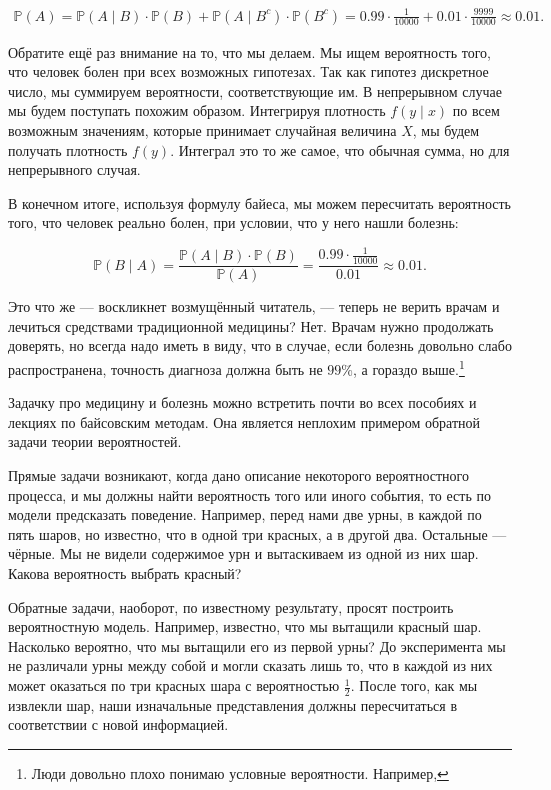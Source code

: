 \documentclass[12pt, a4paper, oneside]{extreport}
\def \mbb{\mathbb}
\def \PP{\mbb{P}}
\theoremstyle{plain}              %
\theoremstyle{definition}         %
\begin{document}
\begin{multline*}
\PP(A)  = \PP(A\mid B) \cdot \PP(B) + \PP(A \mid B^{c})  \cdot \PP(B^{c})  = 0.99 \cdot \frac{1}{10000} + 0.01 \cdot \frac{9999}{10000} \approx 0.01.
\end{multline*}

Обратите ещё раз внимание на то, что мы делаем. Мы ищем вероятность того, что человек болен при всех возможных гипотезах. Так как гипотез дискретное число, мы суммируем вероятности, соответствующие им.  В непрерывном случае мы будем поступать похожим образом.  Интегрируя плотность $f(y \mid x)$ по всем возможным значениям, которые принимает случайная величина $X$, мы будем получать плотность $f(y)$. Интеграл это то же самое, что обычная сумма, но для непрерывного случая.

В конечном итоге, используя формулу байеса, мы можем пересчитать вероятность того, что человек реально болен, при условии, что у него нашли болезнь:

\[  \PP(B \mid A) = \frac{ \PP(A \mid B)\cdot \PP(B) }{\PP(A)}  = \frac{0.99 \cdot \frac{1}{10000}}{0.01} \approx 0.01. \]

Это что же --- воскликнет возмущённый читатель, --- теперь не верить врачам и лечиться средствами традиционной медицины? Нет. Врачам нужно продолжать доверять, но всегда надо иметь в виду, что в случае, если болезнь довольно слабо распространена, точность диагноза должна быть не $99\%$, а гораздо выше.\footnote{Люди довольно плохо понимаю условные вероятности. Например, }

Задачку про медицину и болезнь можно встретить почти во всех пособиях и лекциях по байсовским методам. Она является неплохим примером обратной задачи теории вероятностей. 

Прямые задачи возникают, когда дано описание некоторого вероятностного процесса, и мы должны найти вероятность того или иного события, то есть по модели предсказать поведение. Например, перед нами две урны, в каждой по пять шаров, но известно, что в одной три красных, а в другой два. Остальные --- чёрные.  Мы не видели содержимое урн и вытаскиваем из одной из них шар. Какова вероятность выбрать красный? 

Обратные задачи, наоборот, по известному результату, просят построить вероятностную модель.  Например, известно, что мы вытащили красный шар. Насколько вероятно, что мы вытащили его из первой урны?  До эксперимента мы не различали урны между собой и могли сказать лишь то, что в каждой из них может оказаться по три красных шара с вероятностью $\frac{1}{2}$. После того, как мы извлекли шар,  наши изначальные представления должны пересчитаться в соответствии с новой информацией.
\end{document}
